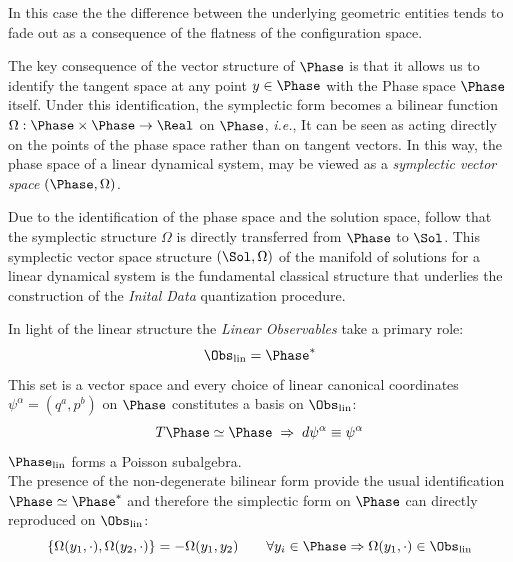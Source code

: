 \documentclass[Main]{subfiles}
\begin{document}
	In this case the the difference between the underlying geometric entities tends to fade out as a consequence of the flatness of the configuration space.
	
	The key consequence of the vector structure of $\Phase$  is that it allows us to identify the tangent space at any point $y \in \Phase$ with the Phase space $\Phase$ itself.
	Under this identification, the symplectic form becomes a bilinear function $\Omega: \Phase \times \Phase \rightarrow \Real$ on $\Phase$, \textit{i.e.}, It can be seen as acting directly on the points of the phase space rather than on tangent vectors.
	In this way, the phase space of a linear dynamical system, may be viewed  as a \emph{symplectic vector space} $(\Phase, \Omega)$.
	
	Due to the identification of the phase space and the solution space, follow that the symplectic structure $\Omega$ is directly transferred from $\Phase$ to $\Sol$. This symplectic vector space structure $( \Sol	, \Omega)$ of the manifold of solutions for a linear dynamical system is the fundamental classical structure that underlies the construction of the \emph{Inital Data} quantization procedure.
	
	In light of the linear structure the \emph{Linear Observables} take a primary role:
	\begin{displaymath}
		\Obs_{\textrm{lin}} = \Phase^*
	\end{displaymath}
	This set is a vector space and every choice of linear canonical coordinates $\psi^\alpha = (q^a, p^b)$ on $\Phase$ constitutes a  basis on $\Obs_{\textrm{lin}} $:
	\begin{displaymath}
		T\Phase \simeq \Phase \; \Rightarrow \; d\psi^\alpha \equiv \psi^\alpha
	\end{displaymath}
	$\Phase_{\textrm{lin}}$ forms a Poisson subalgebra.
	\\%
	The presence of the non-degenerate bilinear form provide the usual identification $\Phase \simeq \Phase^*$ and therefore the simplectic form on $\Phase$ can directly reproduced on $\Obs_{\textrm{lin}} $:
	\begin{displaymath}
		\{ \Omega(y_1, \cdot),\Omega(y_2, \cdot)\} = - \Omega(y_1, y_2) \qquad \forall y_i \in \Phase \Rightarrow \Omega(y_1, \cdot) \in \Obs_\textrm{lin}
	\end{displaymath}

	
	
\end{document}
